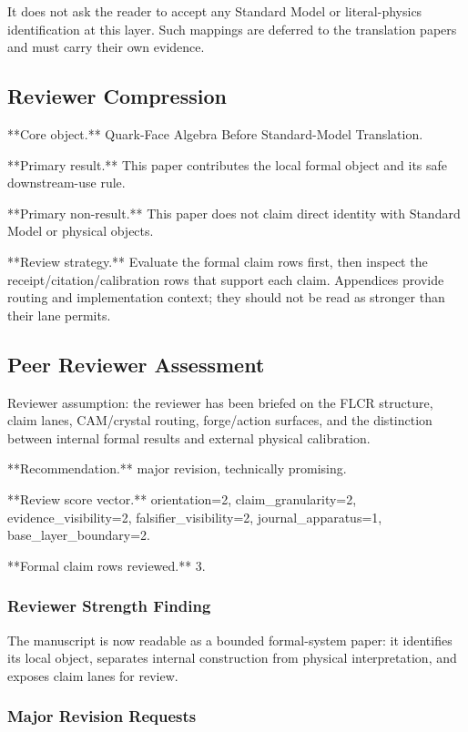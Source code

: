\documentclass[11pt]{article}
\begin{document}
It does not ask the reader to accept any Standard Model or literal-physics identification at this layer. Such mappings are deferred to the translation papers and must carry their own evidence.

\subsection*{Reviewer Compression}

**Core object.** Quark-Face Algebra Before Standard-Model Translation.

**Primary result.** This paper contributes the local formal object and its safe downstream-use rule.

**Primary non-result.** This paper does not claim direct identity with Standard Model or physical objects.

**Review strategy.** Evaluate the formal claim rows first, then inspect the receipt/citation/calibration rows that support each claim. Appendices provide routing and implementation context; they should not be read as stronger than their lane permits.

\subsection*{Peer Reviewer Assessment}

Reviewer assumption: the reviewer has been briefed on the FLCR structure, claim lanes, CAM/crystal routing, forge/action surfaces, and the distinction between internal formal results and external physical calibration.

**Recommendation.** major revision, technically promising.

**Review score vector.** orientation=2, claim\_granularity=2, evidence\_visibility=2, falsifier\_visibility=2, journal\_apparatus=1, base\_layer\_boundary=2.

**Formal claim rows reviewed.** 3.

\subsubsection*{Reviewer Strength Finding}

The manuscript is now readable as a bounded formal-system paper: it identifies its local object, separates internal construction from physical interpretation, and exposes claim lanes for review.

\subsubsection*{Major Revision Requests}
\end{document}
